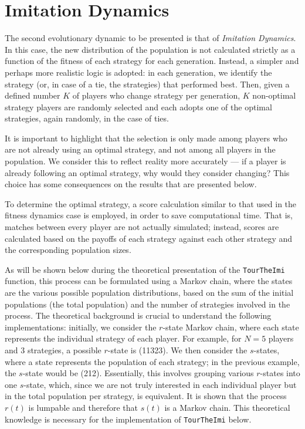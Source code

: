 \section{Imitation Dynamics}
The second evolutionary dynamic to be presented is that of \textit{Imitation Dynamics}. In this case, the new distribution of the population is not calculated strictly as a function of the fitness of each strategy for each generation. Instead, a simpler and perhaps more realistic logic is adopted: in each generation, we identify the strategy (or, in case of a tie, the strategies) that performed best. Then, given a defined number \( K \) of players who change strategy per generation, \( K \) non-optimal strategy players are randomly selected and each adopts one of the optimal strategies, again randomly, in the case of ties.

It is important to highlight that the selection is only made among players who are not already using an optimal strategy, and not among all players in the population. We consider this to reflect reality more accurately --- if a player is already following an optimal strategy, why would they consider changing? This choice has some consequences on the results that are presented below.

To determine the optimal strategy, a score calculation similar to that used in the fitness dynamics case is employed, in order to save computational time. That is, matches between every player are not actually simulated; instead, scores are calculated based on the payoffs of each strategy against each other strategy and the corresponding population sizes.

As will be shown below during the theoretical presentation of the \texttt{TourTheImi} function, this process can be formulated using a Markov chain, where the states are the various possible population distributions, based on the sum of the initial populations (the total population) and the number of strategies involved in the process. The theoretical background is crucial to understand the following implementations: initially, we consider the \( r \)-state Markov chain, where each state represents the individual strategy of each player. For example, for \( N = 5 \) players and 3 strategies, a possible \( r \)-state is (11323). We then consider the \( s \)-states, where a state represents the population of each strategy; in the previous example, the \( s \)-state would be (212). Essentially, this involves grouping various \( r \)-states into one \( s \)-state, which, since we are not truly interested in each individual player but in the total population per strategy, is equivalent. It is shown that the process \( r(t) \) is lumpable and therefore that \( s(t) \) is a Markov chain. This theoretical knowledge is necessary for the implementation of \texttt{TourTheImi} below.

